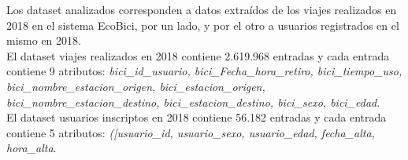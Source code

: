 Los dataset analizados corresponden a datos extraídos de los viajes realizados en 2018 en el sistema EcoBici, por un lado, y por el otro a usuarios registrados en el mismo en 2018.\\
El dataset viajes realizados en 2018 contiene 2.619.968 entradas y cada entrada contiene 9 atributos: \textit{bici_id_usuario, bici_Fecha_hora_retiro, bici_tiempo_uso, bici_nombre_estacion_origen, bici_estacion_origen, bici_nombre_estacion_destino, bici_estacion_destino, bici_sexo, bici_edad}.\\
El dataset usuarios inscriptos en 2018 contiene 56.182 entradas y cada entrada contiene 5 atributos: \textit{([usuario_id, usuario_sexo, usuario_edad, fecha_alta, hora_alta}.